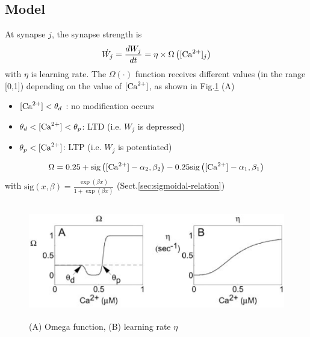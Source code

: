 \subsection{Model }

At synapse $j$, the synapse strength is
\begin{equation}
\dot{W_j} =\frac{dW_j}{dt} = \eta \times \Omega\left( [{\text{Ca}^{2+}}]_j \right)
\end{equation}
with $\eta $ is learning rate.
The $\Omega(\cdot)$ function receives different values (in the range [0,1])
depending on the value of $[{\text{Ca}^{2+}}]$, as shown in Fig.\ref{fig:Shouval2012_omega_eta} (A)
\begin{itemize}
  \item $[{\text{Ca}^{2+}}] < \theta_d$ : no modification occurs
  
  \item $\theta_d < [{\text{Ca}^{2+}}] < \theta_p$: LTD (i.e. $W_j$ is depressed)
  
  \item $\theta_p < [{\text{Ca}^{2+}}]$: LTP (i.e. $W_j$ is potentiated)
\end{itemize}
\def\sig{{\text{sig}}}
\begin{equation}
\Omega = 0.25 + \sig \left( [\Ca] - \alpha_2, \beta_2 \right) - 
         0.25 \sig \left( [\Ca]-\alpha_1, \beta_1 \right)
\end{equation}
with $\sig(x,\beta) = \frac{\exp(\beta x)}{1 + \exp(\beta x)}$
(Sect.\ref{sec:sigmoidal-relation})

\begin{figure}[htb]
  \centerline{\includegraphics[height=5cm]{./images/Shouval2012_omega_eta.eps}}
  \caption{(A) Omega function, (B) learning
  rate $\eta$}\label{fig:Shouval2012_omega_eta}
\end{figure}

